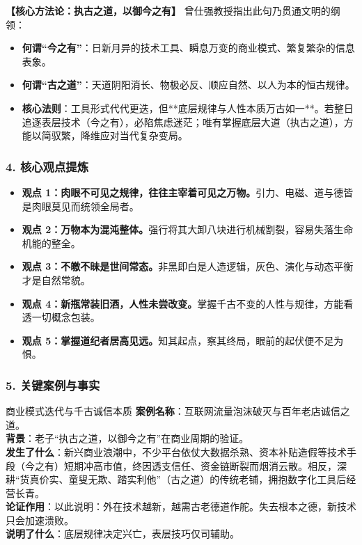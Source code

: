 \noindent\textbf{【核心方法论：执古之道，以御今之有】}
曾仕强教授指出此句乃贯通文明的纲领：
\begin{itemize}
    \item \textbf{何谓“今之有”}：日新月异的技术工具、瞬息万变的商业模式、繁复繁杂的信息表象。
    \item \textbf{何谓“古之道”}：天道阴阳消长、物极必反、顺应自然、以人为本的恒古规律。
    \item \textbf{核心法则}：工具形式代代更迭，但**底层规律与人性本质万古如一**。若整日追逐表层技术（今之有），必陷焦虑迷茫；唯有掌握底层大道（执古之道），方能以简驭繁，降维应对当代复杂变局。
\end{itemize}

\subsubsection{4. 核心观点提炼}
\begin{itemize}
    \item \textbf{观点 1：肉眼不可见之规律，往往主宰着可见之万物。}引力、电磁、道与德皆是肉眼莫见而统领全局者。
    \item \textbf{观点 2：万物本为混沌整体。}强行将其大卸八块进行机械割裂，容易失落生命机能的整全。
    \item \textbf{观点 3：不皦不昧是世间常态。}非黑即白是人造逻辑，灰色、演化与动态平衡才是自然常貌。
    \item \textbf{观点 4：新瓶常装旧酒，人性未尝改变。}掌握千古不变的人性与规律，方能看透一切概念包装。
    \item \textbf{观点 5：掌握道纪者居高见远。}知其起点，察其终局，眼前的起伏便不足为惧。
\end{itemize}

\subsubsection{5. 关键案例与事实}
\begin{CaseBox}{商业模式迭代与千古诚信本质}
\textbf{案例名称}：互联网流量泡沫破灭与百年老店诚信之道。\\
\textbf{背景}：老子“执古之道，以御今之有”在商业周期的验证。\\
\textbf{发生了什么}：新兴商业浪潮中，不少平台依仗大数据杀熟、资本补贴造假等技术手段（今之有）短期冲高市值，终因透支信任、资金链断裂而烟消云散。相反，深耕“货真价实、童叟无欺、踏实利他”（古之道）的传统老铺，拥抱数字化工具后经营长青。\\
\textbf{论证作用}：以此说明：外在技术越新，越需古老德道作舵。失去根本之德，新技术只会加速溃败。\\
\textbf{说明了什么}：底层规律决定兴亡，表层技巧仅司辅助。
\end{CaseBox}

